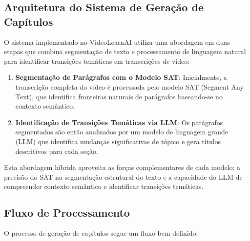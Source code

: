 \documentclass[tcc,capa]{texufpel}
\begin{document}
\subsection{Arquitetura do Sistema de Geração de Capítulos}

O sistema implementado no VideoLearnAI utiliza uma abordagem em duas etapas que combina segmentação de texto e processamento de linguagem natural para identificar transições temáticas em transcrições de vídeo:

\begin{enumerate}
    \item \textbf{Segmentação de Parágrafos com o Modelo SAT}: Inicialmente, a transcrição completa do vídeo é processada pelo modelo SAT (Segment Any Text), que identifica fronteiras naturais de parágrafos baseando-se no contexto semântico.

    \item \textbf{Identificação de Transições Temáticas via LLM}: Os parágrafos segmentados são então analisados por um modelo de linguagem grande (LLM) que identifica mudanças significativas de tópico e gera títulos descritivos para cada seção.
\end{enumerate}

Esta abordagem híbrida aproveita as forças complementares de cada modelo: a precisão do SAT na segmentação estrutural do texto e a capacidade do LLM de compreender contexto semântico e identificar transições temáticas.

\subsection{Fluxo de Processamento}

O processo de geração de capítulos segue um fluxo bem definido:
\end{document}
